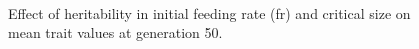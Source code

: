 \begin{figure}[p]
  \\
  \caption{Effect of heritability in initial feeding rate (fr) and critical size on mean trait values at generation 50.}
  \label{fig:omg_fr_mc}
\end{figure}
